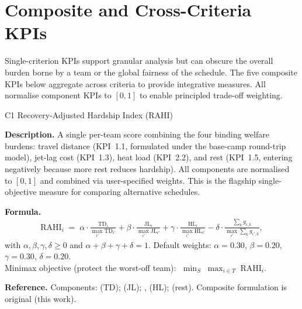 \documentclass[12pt, letterpaper]{article}
\newcommand{\kpilabel}[1]{\noindent\textbf{#1}\enspace}
\begin{document}
\section{Composite and Cross-Criteria KPIs}
\label{sec:composite}

Single-criterion KPIs support granular analysis but can obscure the
overall burden borne by a team or the global fairness of the schedule.
The five composite KPIs below aggregate across criteria to provide
integrative measures.  All normalise
component KPIs to $[0,1]$ to enable principled trade-off weighting.

\begin{kpibox}{C1 \textendash{} Recovery-Adjusted Hardship Index (RAHI)}

\kpilabel{Description.}
A single per-team score combining the four binding welfare burdens:
travel distance (KPI~1.1, formulated under the base-camp round-trip
model), jet-lag cost (KPI~1.3), heat load (KPI~2.2), and rest
(KPI~1.5, entering negatively because more rest reduces hardship).
All components are normalised to $[0,1]$ and combined via
user-specified weights.  This is the flagship single-objective measure
for comparing alternative schedules.

\medskip
\kpilabel{Formula.}
\begin{align*}
  \mathrm{RAHI}_i \;=\;
    \alpha \cdot \frac{\mathrm{TD}_i}{\max_{i'}\mathrm{TD}_{i'}}
    + \beta \cdot \frac{\mathrm{JL}_i}{\max_{i'}\mathrm{JL}_{i'}}
    + \gamma \cdot \frac{\mathrm{HL}_i}{\max_{i'}\mathrm{HL}_{i'}}
    - \delta \cdot \frac{\sum_k g_{i,k}}
                        {\max_{i'}\sum_k g_{i',k}},
\end{align*}
with $\alpha,\beta,\gamma,\delta \geq 0$ and
$\alpha + \beta + \gamma + \delta = 1$.
Default weights: $\alpha = 0.30$, $\beta = 0.20$, $\gamma = 0.30$,
$\delta = 0.20$.\\[4pt]
Minimax objective (protect the worst-off team):
$\;\displaystyle\min_{S}\;\max_{i \in T}\;\mathrm{RAHI}_i$.

\medskip
\kpilabel{Reference.}
Components: \citet{Easton2001} (TD); \citet{Recht1995} (JL);
\citet{Liljegren2008}, \citet{FIFPRO2025} (HL);
\citet{AtanCavdaroglu2018} (rest).
Composite formulation is original (this work).
\end{kpibox}
\end{document}

